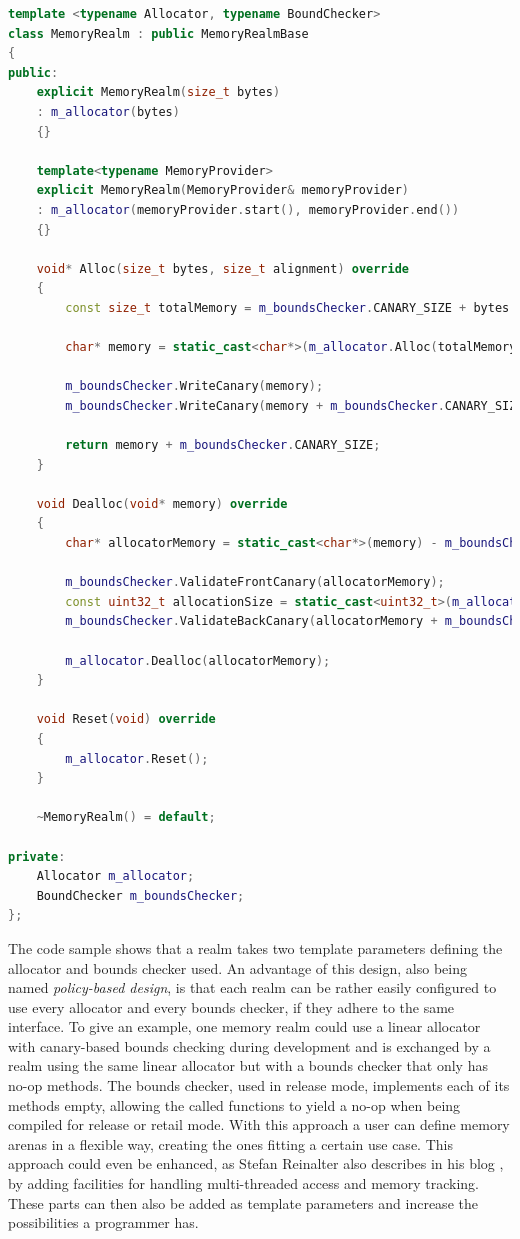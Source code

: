 \begin{lstlisting}[caption={Implementation of the memory realm in C++. Some implementation deatils were omitted.)}, label={lst:cpp_mem_realm}, language={C++}]
template <typename Allocator, typename BoundChecker>
class MemoryRealm : public MemoryRealmBase
{
public:
	explicit MemoryRealm(size_t bytes)
	: m_allocator(bytes)
	{}
	
	template<typename MemoryProvider>
	explicit MemoryRealm(MemoryProvider& memoryProvider)
	: m_allocator(memoryProvider.start(), memoryProvider.end())
	{}
	
	void* Alloc(size_t bytes, size_t alignment) override
	{
		const size_t totalMemory = m_boundsChecker.CANARY_SIZE + bytes + m_boundsChecker.CANARY_SIZE;
		
		char* memory = static_cast<char*>(m_allocator.Alloc(totalMemory, alignment, m_boundsChecker.CANARY_SIZE));
		
		m_boundsChecker.WriteCanary(memory);
		m_boundsChecker.WriteCanary(memory + m_boundsChecker.CANARY_SIZE + bytes);
		
		return memory + m_boundsChecker.CANARY_SIZE;
	}
	
	void Dealloc(void* memory) override
	{
		char* allocatorMemory = static_cast<char*>(memory) - m_boundsChecker.CANARY_SIZE;
		
		m_boundsChecker.ValidateFrontCanary(allocatorMemory);
		const uint32_t allocationSize = static_cast<uint32_t>(m_allocator.GetAllocationSize(allocatorMemory));
		m_boundsChecker.ValidateBackCanary(allocatorMemory + m_boundsChecker.CANARY_SIZE + allocationSize);
		
		m_allocator.Dealloc(allocatorMemory);
	}
	
	void Reset(void) override
	{
		m_allocator.Reset();
	}
	
	~MemoryRealm() = default;

private:
	Allocator m_allocator;
	BoundChecker m_boundsChecker;
};
\end{lstlisting}

\noindent
The code sample shows that a realm takes two template parameters defining the allocator and bounds checker used. An advantage of this design, also being named \textit{policy-based design}, is that each realm can be rather easily configured to use every allocator and every bounds checker, if they adhere to the same interface. To give an example, one memory realm could use a linear allocator with canary-based bounds checking during development and is exchanged by a realm using the same linear allocator but with a bounds checker that only has no-op methods. The bounds checker, used in release mode, implements each of its methods empty, allowing the called functions to yield a no-op when being compiled for release or retail mode. With this approach a user can define memory arenas in a flexible way, creating the ones fitting a certain use case. This approach could even be enhanced, as Stefan Reinalter also describes in his blog \cite{MOL_MS_5}, by adding facilities for handling multi-threaded access and memory tracking. These parts can then also be added as template parameters and increase the possibilities a programmer has.

